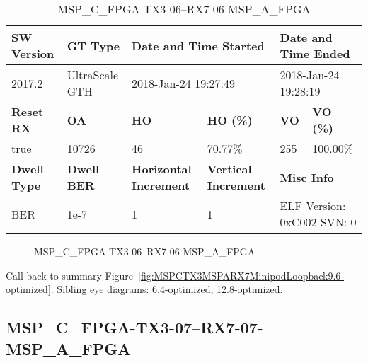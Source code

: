 \begin{table}[h]
\centering
\caption{MSP\_C\_FPGA-TX3-06--RX7-06-MSP\_A\_FPGA}
\label{tab:MSPCFPGATX306RX706MSPAFPGA9.6-optimized}
\begin{tabular}{@{}|l|l|l|l|l|l|@{}}
\toprule
\textbf{SW Version}                & \textbf{GT Type}   & \multicolumn{2}{l|}{\textbf{Date and Time Started}}            & \multicolumn{2}{l|}{\textbf{Date and Time Ended}}        \\ \midrule
2017.2                       & UltraScale GTH          & \multicolumn{2}{l|}{2018-Jan-24 19:27:49}                   & \multicolumn{2}{l|}{2018-Jan-24 19:28:19}               \\ \midrule
\textbf{Reset RX}                  & \textbf{OA} & \textbf{HO}   & \textbf{HO (\%)} & \textbf{VO} & \textbf{VO (\%)} \\ \midrule
true & 10726        & 46          & 70.77\%        & 255        & 100.00\%       \\ \midrule
\textbf{Dwell Type}                & \textbf{Dwell BER} & \textbf{Horizontal Increment} & \textbf{Vertical Increment}    & \multicolumn{2}{l|}{\textbf{Misc Info}}                  \\ \midrule
BER                            & 1e-7        & 1        & 1           & \multicolumn{2}{l|}{ELF Version: 0xC002 SVN: 0}                         \\ \bottomrule
\end{tabular}
\end{table}

\begin{figure}[h]
\caption{MSP\_C\_FPGA-TX3-06--RX7-06-MSP\_A\_FPGA} \label{fig:MSPCFPGATX306RX706MSPAFPGA9.6-optimized}
\end{figure}

Call back to summary Figure~\ref{fig:MSPCTX3MSPARX7MinipodLoopback9.6-optimized}.
Sibling eye diagrams: \hyperref[sec:MSPCFPGATX306RX706MSPAFPGA6.4-optimized]{6.4-optimized}, \hyperref[sec:MSPCFPGATX306RX706MSPAFPGA12.8-optimized]{12.8-optimized}.

\clearpage
\newpage


\subsection{MSP\_C\_FPGA-TX3-07--RX7-07-MSP\_A\_FPGA}\label{sec:MSPCFPGATX307RX707MSPAFPGA9.6-optimized}

